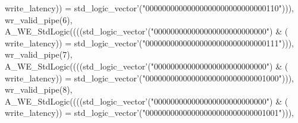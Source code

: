 \begin{DoxyCode}
{      write_latency}\textcolor{vhdlchar}{)}\textcolor{vhdlchar}{)} \textcolor{vhdlchar}{=} \textcolor{comment}{std\_logic\_vector}\textcolor{vhdlchar}{'}\textcolor{vhdlchar}{(}\textcolor{vhdllogic}{"00000000000000000000000000000110"}\textcolor{vhdlchar}{)}\textcolor{vhdlchar}{)}\textcolor{vhdlchar}{)}\textcolor{vhdlchar}{,} \textcolor{vhdlchar}{
      wr_valid_pipe}\textcolor{vhdlchar}{(}\textcolor{vhdllogic}{}\textcolor{vhdllogic}{6}\textcolor{vhdlchar}{)}\textcolor{vhdlchar}{,} \textcolor{vhdlchar}{A\_WE\_StdLogic}\textcolor{vhdlchar}{(}\textcolor{vhdlchar}{(}\textcolor{vhdlchar}{(}\textcolor{vhdlchar}{(}\textcolor{comment}{std\_logic\_vector}\textcolor{vhdlchar}{'}\textcolor{vhdlchar}{(}\textcolor{vhdllogic}{"000000000000000000000000000"}\textcolor{vhdlchar}{)} \textcolor{vhdlchar}{&} \textcolor{vhdlchar}{(}\textcolor{vhdlchar}{
      write_latency}\textcolor{vhdlchar}{)}\textcolor{vhdlchar}{)} \textcolor{vhdlchar}{=} \textcolor{comment}{std\_logic\_vector}\textcolor{vhdlchar}{'}\textcolor{vhdlchar}{(}\textcolor{vhdllogic}{"00000000000000000000000000000111"}\textcolor{vhdlchar}{)}\textcolor{vhdlchar}{)}\textcolor{vhdlchar}{)}\textcolor{vhdlchar}{,} \textcolor{vhdlchar}{
      wr_valid_pipe}\textcolor{vhdlchar}{(}\textcolor{vhdllogic}{}\textcolor{vhdllogic}{7}\textcolor{vhdlchar}{)}\textcolor{vhdlchar}{,} \textcolor{vhdlchar}{A\_WE\_StdLogic}\textcolor{vhdlchar}{(}\textcolor{vhdlchar}{(}\textcolor{vhdlchar}{(}\textcolor{vhdlchar}{(}\textcolor{comment}{std\_logic\_vector}\textcolor{vhdlchar}{'}\textcolor{vhdlchar}{(}\textcolor{vhdllogic}{"000000000000000000000000000"}\textcolor{vhdlchar}{)} \textcolor{vhdlchar}{&} \textcolor{vhdlchar}{(}\textcolor{vhdlchar}{
      write_latency}\textcolor{vhdlchar}{)}\textcolor{vhdlchar}{)} \textcolor{vhdlchar}{=} \textcolor{comment}{std\_logic\_vector}\textcolor{vhdlchar}{'}\textcolor{vhdlchar}{(}\textcolor{vhdllogic}{"00000000000000000000000000001000"}\textcolor{vhdlchar}{)}\textcolor{vhdlchar}{)}\textcolor{vhdlchar}{)}\textcolor{vhdlchar}{,} \textcolor{vhdlchar}{
      wr_valid_pipe}\textcolor{vhdlchar}{(}\textcolor{vhdllogic}{}\textcolor{vhdllogic}{8}\textcolor{vhdlchar}{)}\textcolor{vhdlchar}{,} \textcolor{vhdlchar}{A\_WE\_StdLogic}\textcolor{vhdlchar}{(}\textcolor{vhdlchar}{(}\textcolor{vhdlchar}{(}\textcolor{vhdlchar}{(}\textcolor{comment}{std\_logic\_vector}\textcolor{vhdlchar}{'}\textcolor{vhdlchar}{(}\textcolor{vhdllogic}{"000000000000000000000000000"}\textcolor{vhdlchar}{)} \textcolor{vhdlchar}{&} \textcolor{vhdlchar}{(}\textcolor{vhdlchar}{
      write_latency}\textcolor{vhdlchar}{)}\textcolor{vhdlchar}{)} \textcolor{vhdlchar}{=} \textcolor{comment}{std\_logic\_vector}\textcolor{vhdlchar}{'}\textcolor{vhdlchar}{(}\textcolor{vhdllogic}{"00000000000000000000000000001001"}\textcolor{vhdlchar}{)}\textcolor{vhdlchar}{)}\textcolor{vhdlchar}{)}\textcolor{vhdlchar}{,} \textcolor{vhdlchar}{
}
\end{DoxyCode}

